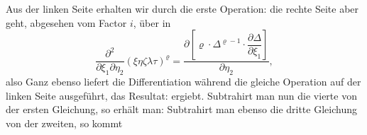 Aus der linken Seite erhalten wir durch die erste Operation:
die rechte Seite aber geht, abgesehen vom Factor $i$, über in
\[
\frac{\partial^2}{\partial \xi_1 \partial \eta_2} (\xi\eta\zeta\lambda\tau)^\varrho = \frac{\partial\left[\varrho \cdot \Delta^{\varrho-1} \cdot \dfrac{\partial \Delta}{\partial \xi_1}\right]}{\partial \eta_2},
\]
also
Ganz ebenso liefert die Differentiation
während die gleiche Operation auf der linken Seite ausgeführt, das Resultat:
ergiebt. Subtrahirt man nun die vierte von der ersten Gleichung, so erhält man:
Subtrahirt man ebenso die dritte Gleichung von der zweiten, so kommt


